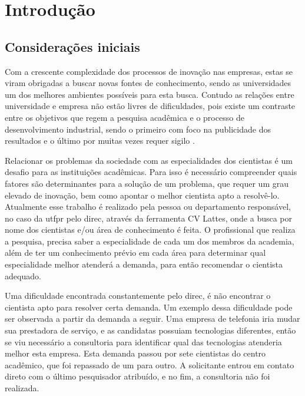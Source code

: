 \chapter{Introdução}\label{cap:introducao}

\section{Considerações iniciais}\label{sec:consideracoesIniciais}

Com a crescente complexidade dos processos de inovação nas empresas, estas se viram obrigadas a buscar novas fontes de conhecimento, sendo as universidades um dos melhores ambientes possíveis para esta busca. Contudo as relações entre universidade e empresa não estão livres de dificuldades, pois existe um contraste entre os objetivos que regem a pesquisa acadêmica e o processo de desenvolvimento industrial, sendo o primeiro com foco na publicidade dos resultados e o último por muitas vezes requer sigilo \cite{UnicampIE}. 

Relacionar os problemas da sociedade com as especialidades dos cientistas é um desafio para as instituições acadêmicas. Para isso é necessário compreender quais fatores são determinantes para a solução de um problema, que requer um grau elevado de inovação, bem como apontar o melhor cientista apto a resolvê-lo. Atualmente esse trabalho é realizado pela pessoa ou departamento responsável, no caso da \gls{utfpr} pelo \gls{direc}, através da ferramenta CV Lattes, onde a busca por nome dos cientistas e/ou área de conhecimento é feita. O profissional que realiza a pesquisa, precisa saber a especialidade de cada um dos membros da academia, além de ter um conhecimento prévio em cada área para determinar qual especialidade melhor atenderá a demanda, para então recomendar o cientista adequado.

Uma dificuldade encontrada constantemente pelo \gls{direc}, é não encontrar o cientista apto para resolver certa demanda. Um exemplo dessa dificuldade pode ser observada a partir da demanda a seguir. Uma empresa de telefonia iria mudar sua prestadora de serviço, e as candidatas possuiam tecnologias diferentes, então se viu necessário a consultoria para identificar qual das tecnologias atenderia melhor esta empresa. Esta demanda passou por sete cientistas do centro acadêmico, que foi repassado de um para outro. A solicitante entrou em contato direto com o último pesquisador atribuído, e no fim, a consultoria não foi realizada.

